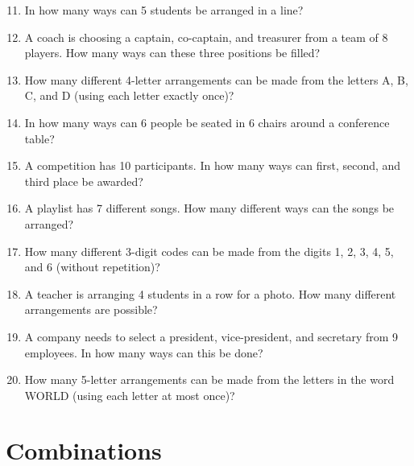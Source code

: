 \documentclass[12pt]{article}
\begin{document}
\begin{enumerate}
\setcounter{enumi}{10}

\item In how many ways can 5 students be arranged in a line?

\item A coach is choosing a captain, co-captain, and treasurer from a team of 8 players. How many ways can these three positions be filled?

\item How many different 4-letter arrangements can be made from the letters A, B, C, and D (using each letter exactly once)?

\item In how many ways can 6 people be seated in 6 chairs around a conference table?

\item A competition has 10 participants. In how many ways can first, second, and third place be awarded?

\item A playlist has 7 different songs. How many different ways can the songs be arranged?

\item How many different 3-digit codes can be made from the digits 1, 2, 3, 4, 5, and 6 (without repetition)?

\item A teacher is arranging 4 students in a row for a photo. How many different arrangements are possible?

\item A company needs to select a president, vice-president, and secretary from 9 employees. In how many ways can this be done?

\item How many 5-letter arrangements can be made from the letters in the word WORLD (using each letter at most once)?

\end{enumerate}

\section{Combinations}
\end{document}
